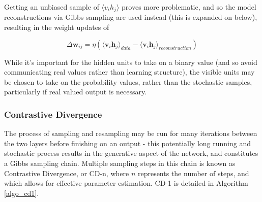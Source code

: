 \documentclass[a4paper,11pt,oneside]{article}
\theoremstyle{plain}
\theoremstyle{definition}
\begin{document}
	
	Getting an unbiased sample of $\langle v_i h_j \rangle$ proves more problematic, and so the model reconstructions via Gibbs sampling are used instead (this is expanded on below), resulting in the weight updates of
	
	\begin{equation}
	\Delta \mathbf{w}_{ij} = \eta (\langle \mathbf{v}_i\mathbf{h}_j\rangle_{data} - \langle \mathbf{v}_i\mathbf{h}_j\rangle_{reconstruction})
	\end{equation}
	
	While it's important for the hidden units to take on a binary value (and so avoid communicating real values rather than learning structure), the visible units may be chosen to take on the probability values, rather than the stochastic samples, particularly if real valued output is necessary. 
	
	\subsubsection{Contrastive Divergence}\label{imp_CD}
	
	The process of sampling and resampling may be run for many iterations between the two layers before finishing on an output - this potentially long running and stochastic process results in the generative aspect of the network, and constitutes a Gibbs sampling chain. Multiple sampling steps in this chain is known as Contrastive Divergence, or CD-n, where $n$ represents the number of steps, and which allows for effective parameter estimation. CD-1 is detailed in Algorithm \ref{algo_cd1}.\newline
	
\end{document}
